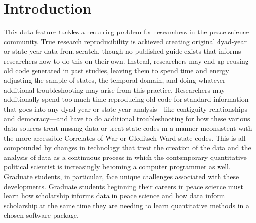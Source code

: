 \documentclass[
  11pt,
]{article}
\begin{document}
\vskip -8.5pt




\setlength{\parindent}{16pt}
\setlength{\parskip}{0pt}

\hypertarget{introduction}{%
\section{Introduction}\label{introduction}}

This data feature tackles a recurring problem for researchers in the peace science community. True research reproducibility is achieved creating original dyad-year or state-year data from scratch, though no published guide exists that informs researchers how to do this on their own. Instead, researchers may end up reusing old code generated in past studies, leaving them to spend time and energy adjusting the sample of states, the temporal domain, and doing whatever additional troubleshooting may arise from this practice. Researchers may additionally spend too much time reproducing old code for standard information that goes into any dyad-year or state-year analysis---like contiguity relationships and democracy---and have to do additional troubleshooting for how these various data sources treat missing data or treat state codes in a manner inconsistent with the more accessible Correlates of War or Gleditsch-Ward state codes. This is all compounded by changes in technology that treat the creation of the data and the analysis of data as a continuous process in which the contemporary quantitative political scientist is increasingly becoming a computer programmer as well. Graduate students, in particular, face unique challenges associated with these developments. Graduate students beginning their careers in peace science must learn how scholarship informs data in peace science and how data inform scholarship at the same time they are needing to learn quantitative methods in a chosen software package.
\end{document}
